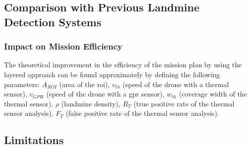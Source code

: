 \subsection{Comparison with Previous Landmine Detection Systems}
\label{sec:msp_comparison_manual_demining}

\subsubsection{Impact on Mission Efficiency}

The theoretical improvement in the efficiency of the mission plan by using the layered approach can be found approximately by defining the following parameters: $A_{ROI}$ (area of the \gls{roi}), $v_{th}$ (speed of the drone with a thermal sensor), $v_{GPR}$ (speed of the drone with a \gls{gpr} sensor), $w_{th}$ (coverage width of the thermal sensor), $\rho$ (landmine density), $R_T$ (true positive rate of the thermal sensor analysis), $F_T$ (false positive rate of the thermal sensor analysis). 






\subsection{Limitations}
\label{sec:msp_limitations}